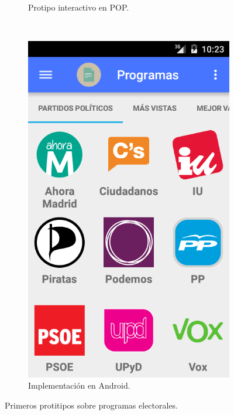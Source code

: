 \begin{enumerate}[label=\textbf{\arabic*})]
\begin{figure}[!]
\begin{subfigure}[b]{0.3\textwidth}
                \caption{Protipo interactivo en POP.}
                \label{fig:quipText}
        \end{subfigure}
        ~
        \begin{subfigure}[b]{0.3\textwidth}
                \includegraphics[width=\textwidth]{Media/Captures/prot1_3.png}
                \caption{Implementación en Android.}
                \label{fig:quipComments}
        \end{subfigure}
        \caption{Primeros protitipos sobre programas electorales.}\label{fig:protPrograms}
	\end{figure}
	

\end{enumerate}
